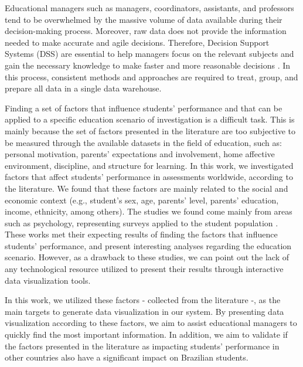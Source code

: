 \documentclass[12pt]{article}
\begin{document}
Educational managers such as managers, coordinators, assistants, and professors tend to be overwhelmed by the massive volume of data available during their decision-making process. Moreover, raw data does not provide the information needed to make accurate and agile decisions. Therefore, Decision Support Systems (DSS) are essential to help managers focus on the relevant subjects and gain the necessary knowledge to make faster and more reasonable decisions \cite{Velasco2020,RoqueeFaria2019}. In this process, consistent methods and approaches are required to treat, group, and prepare all data in a single data warehouse.

Finding a set of factors that influence students' performance and that can be applied to a specific education scenario of investigation is a difficult task. This is mainly because the set of factors presented in the literature are too subjective to be measured through the available datasets in the field of education, such as: personal motivation, parents' expectations and involvement, home affective environment, discipline, and structure for learning. 
In this work, we investigated factors that affect students' performance in assessments worldwide, according to the literature. We found that these factors are mainly related to the social and economic context (e.g., student's sex, age, parents' level, parents' education, income, ethnicity, among others). The studies we found come mainly from areas such as psychology, representing surveys applied to the student population \cite{Farooq2012FACTORSAS, Stewart2007}. These works met their expecting results of finding the factors that influence students' performance, and present interesting analyses regarding the education scenario. However, as a drawback to these studies, we can point out the lack of any technological resource utilized to present their results through interactive data visualization tools.    


In this work, we utilized these factors - collected from the literature -, as the main targets to generate data visualization in our system. By presenting data visualization according to these factors, we aim to assist educational managers to quickly find the most important information. In addition, we aim to validate if the factors presented in the literature as impacting students' performance in other countries also have a significant impact on Brazilian students.
\end{document}
